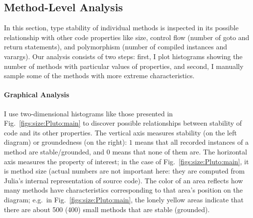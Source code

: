 \subsection{Method-Level Analysis}


In this section,
type stability of
individual methods is inspected
in its possible
relationship with other code properties like size, control flow (number of goto
and return statements), and polymorphism (number of compiled instances and varargs).
Our analysis consists of two steps: first, I plot histograms
showing the number of methods with particular values of properties, and second,
I manually sample some of the methods with more extreme characteristics.

\paragraph{Graphical Analysis}\label{sssect:graphs}

I use two-dimensional histograms like those presented in
Fig.~\ref{figs:size:Pluto:main} to discover possible relationships between stability
of code and its other properties. The vertical axis measures stability (on the
left diagram) or groundedness (on the right): $1$ means that all recorded
instances of a method are stable/grounded, and $0$ means that none of them are.
The horizontal axis measures the property of interest; in the case of
Fig.~\ref{figs:size:Pluto:main}, it is method size (actual numbers are not
important here: they are computed from Julia's internal representation of source
code). The color of an area reflects how many methods have characteristics
corresponding to that area's position on the diagram; e.g.\ in
Fig.~\ref{figs:size:Pluto:main}, the lonely yellow areas indicate that there are about
500 (400) small methods that are stable (grounded).

